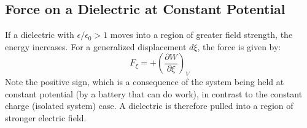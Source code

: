 \documentclass{article}
\begin{document}
	\subsection{Force on a Dielectric at Constant Potential}
	If a dielectric with $\epsilon / \epsilon_0 > 1$ moves into a region of greater field strength, the energy increases. For a generalized displacement $d\xi$, the force is given by:
	$$
	F_\xi = +\left( \frac{\partial W}{\partial \xi} \right)_V
	$$
	Note the positive sign, which is a consequence of the system being held at constant potential (by a battery that can do work), in contrast to the constant charge (isolated system) case. A dielectric is therefore pulled into a region of stronger electric field.
	
	
\end{document}
